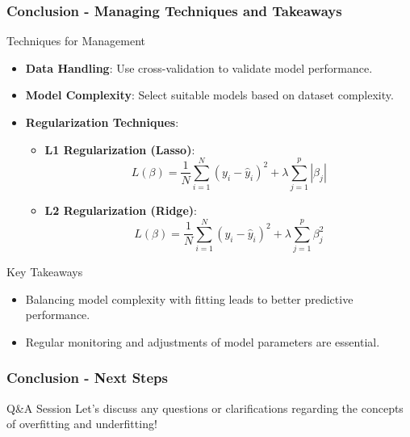 \documentclass[aspectratio=169]{beamer}
\begin{document}
\begin{frame}[fragile]
    \frametitle{Conclusion - Managing Techniques and Takeaways}
    \begin{block}{Techniques for Management}
        \begin{itemize}
            \item \textbf{Data Handling}: Use cross-validation to validate model performance.
            \item \textbf{Model Complexity}: Select suitable models based on dataset complexity.
            \item \textbf{Regularization Techniques}:
                \begin{itemize}
                    \item \textbf{L1 Regularization (Lasso)}: 
                    \begin{equation}
                    L(\beta) = \frac{1}{N} \sum_{i=1}^{N} (y_i - \hat{y}_i)^2 + \lambda \sum_{j=1}^{p} |\beta_j|
                    \end{equation}
                    \item \textbf{L2 Regularization (Ridge)}: 
                    \begin{equation}
                    L(\beta) = \frac{1}{N} \sum_{i=1}^{N} (y_i - \hat{y}_i)^2 + \lambda \sum_{j=1}^{p} \beta_j^2
                    \end{equation}
                \end{itemize}
        \end{itemize}
    \end{block}
    
    \begin{block}{Key Takeaways}
        \begin{itemize}
            \item Balancing model complexity with fitting leads to better predictive performance.
            \item Regular monitoring and adjustments of model parameters are essential.
        \end{itemize}
    \end{block}
\end{frame}

\begin{frame}[fragile]
    \frametitle{Conclusion - Next Steps}
    \begin{block}{Q\&A Session}
        Let's discuss any questions or clarifications regarding the concepts of overfitting and underfitting!
    \end{block}
\end{frame}
\end{document}
